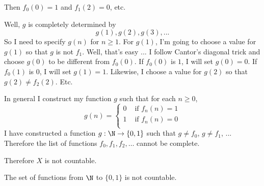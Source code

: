 Then $f_0(0) = 1$ and $f_1(2) = 0$, etc.

Well, $g$ is completely determined by 
\[
g(1), g(2), g(3), ...
\]
So I need to specify $g(n)$ for $n \geq 1$.
For $g(1)$, I'm going to choose a value for $g(1)$ so that 
$g$ is not $f_1$.
Well, that's easy ... I follow Cantor's diagonal trick
and choose $g(0)$ to be different from $f_0(0)$.
If $f_0(0)$ is $1$, I will set $g(0) = 0$.
If $f_0(1)$ is $0$, I will set $g(1) = 1$.
Likewise, I choose a value for $g(2)$ so that $g(2) \neq f_2(2)$.
Etc.

In general I construct my function $g$ such that
for each $n \geq 0$,
\[
g(n)
= 
\begin{cases}
0 & \text{ if } f_n(n) = 1 \\
1 & \text{ if } f_n(n) = 0 \\
\end{cases}
\]
I have constructed a function $g : \N \rightarrow \{0, 1\}$
such that $g \neq f_0$, $g \neq f_1$, ...
Therefore the list of functions $f_0, f_1, f_2, \ldots$ cannot be 
complete.

Therefore $X$ is not countable.

\begin{thm}
The set of functions from $\N$ to $\{0,1\}$ is not countable.
\end{thm}






